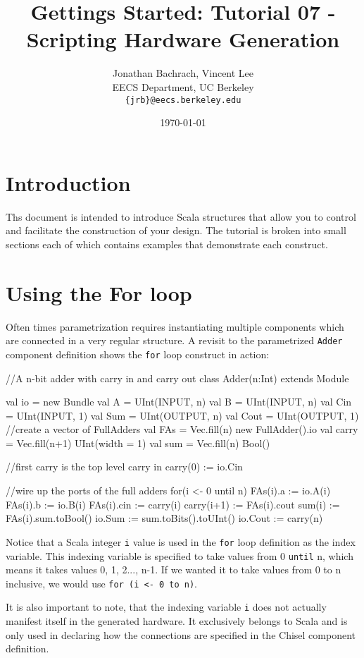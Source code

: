 \documentclass[twocolumn, 10pt]{article}
\title{Gettings Started: Tutorial 07 - Scripting Hardware Generation}
\author{Jonathan Bachrach, Vincent Lee \\
EECS Department, UC Berkeley\\
{\tt  \{jrb\}@eecs.berkeley.edu}
}
\date{\today}
\begin{document}
\maketitle{}

\section{Introduction}

Ths document is intended to introduce Scala structures that allow you to control and facilitate the construction of your design. The tutorial is broken into small sections each of which contains examples that demonstrate each construct.

\section{Using the For loop}

Often times parametrization requires instantiating multiple components which are connected in a very regular structure. A revisit to the parametrized \verb+Adder+ component definition shows the \verb+for+ loop construct in action:

\begin{scala}
//A n-bit adder with carry in and carry out
class Adder(n:Int) extends Module {
  val io = new Bundle {
    val A    = UInt(INPUT, n)
    val B    = UInt(INPUT, n)
    val Cin  = UInt(INPUT, 1)
    val Sum  = UInt(OUTPUT, n)
    val Cout = UInt(OUTPUT, 1)
  }
  //create a vector of FullAdders
  val FAs   = Vec.fill(n){ new FullAdder().io }
  val carry = Vec.fill(n+1){ UInt(width = 1) }
  val sum   = Vec.fill(n){ Bool() }

  //first carry is the top level carry in
  carry(0) := io.Cin

  //wire up the ports of the full adders
  for(i <- 0 until n) {
     FAs(i).a   := io.A(i)
     FAs(i).b   := io.B(i)
     FAs(i).cin := carry(i)
     carry(i+1) := FAs(i).cout
     sum(i)     := FAs(i).sum.toBool()
  }
  io.Sum  := sum.toBits().toUInt()
  io.Cout := carry(n)
}
\end{scala}

Notice that a Scala integer \verb+i+ value is used in the \verb+for+ loop definition as the index variable. This indexing variable is specified to take values from 0 \verb+until+ n, which means it takes values 0, 1, 2..., n-1. If we wanted it to take values from 0 to n inclusive, we would use \verb+for (i <- 0 to n)+.

It is also important to note, that the indexing variable \verb+i+ does not actually manifest itself in the generated hardware. It exclusively belongs to Scala and is only used in declaring how the connections are specified in the Chisel component definition.
\end{document}
